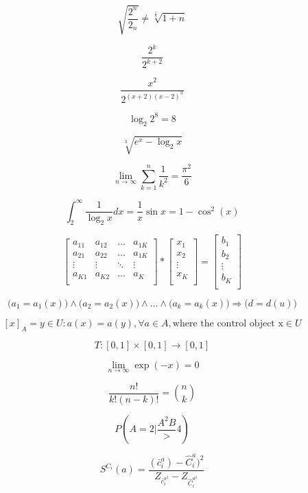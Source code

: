 \documentclass[a4paper]{article}
\begin{document}
\begin{center}
$$ \sqrt{ \frac{2^{n}}{2_n}} \neq \sqrt[\frac{1}{3}]{1+n} $$

$$   \frac{2^{k}}{2^{k+2} } $$

$$   \frac{x^{2}}{2^{(x+2)(x-2)^{3}} } $$ 

$$   \log_{2}2^{8} = 8 $$

$$ \sqrt[3]{e^{x} - \log_2x } $$

$$ \lim_{n\to \infty} \sum_{k=1}^{n}\frac{1}{k^{2}} = \frac{\pi^{2}}{6}  $$ 

$$ \int_{2}^{\infty}  \frac{1}{\log_2x} dx = \frac{1}{x}  \sin x = 1 - \cos^{2}(x) $$

$$
\left[ \begin{array}{cccc}
a_{11} & a_{12} & \ldots & a_{1K} \\
a_{21} & a_{22} & \ldots & a_{1K}  \\
\vdots & \vdots & \ddots &  \vdots \\
a_{K1} &  a_{K2} & \ldots  & a_{K} \\
\end{array} \right]  * 
 \left[ \begin{array}{cccc}
x_{1} \\
x_{2} \\
\vdots \\
x_{K} \\
\end{array} \right]  =
\left[ \begin{array}{cccc}
b_{1} \\
b_{2} \\
\vdots \\
b_{K} \\
\end{array} \right] $$

$$ \big( a_{1} = a_{1}(x) \big) \wedge \big( a_{2} = a_{2}(x) \big) \wedge  \ldots   \wedge  \big( a_{k} = a_{k}(x) \big) \Rightarrow \big( d = d(u) \big)   $$


$$ [x]_A = {y \in U : a(x) = a(y), \forall a \in A}, \text{where the control object x} \in U $$

$$ T:[0,1] \times [0,1] \rightarrow [0,1] $$

$$ \lim_{n\to \infty} \exp(-x)=0 $$ 

$$   \frac{n!}{k!(n - k)!} = \binom{n}{k}$$ 

$$ P \left(A = 2  \bigg| \frac{A^{2}{B}} > 4 \right) $$

$$ S^{C_i} (a) = \frac{(\bar{c}^a_i) - \hat{C}^a_i)^2}{Z_{\bar{c}_i^{a^2}} - Z_{\hat{C}_i^{a^2}}} $$

\end{center}
\end{document}
